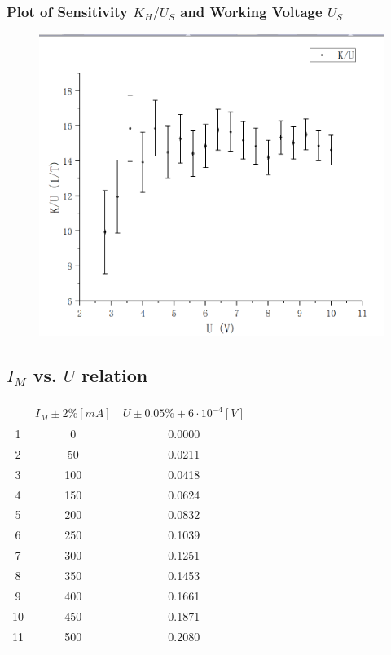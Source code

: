 \documentclass[12pt]{article}
\begin{document}
\subsubsection{Plot of Sensitivity $K_H/U_S$ and Working Voltage $U_S$}
\begin{figure}[H]
\centering
\includegraphics[scale=0.25]{P7.jpg}
\end{figure}
\subsection{$I_M$ vs. $U$ relation}
\begin{table}[H]
\centering
\begin{tabular}{|c|c|c|}
\hline
  &$I_M\pm2\%[mA]$&$U\pm0.05\%+6\cdot 10^{-4}[V]$  \\ \hline
1 &0    &0.0000  \\ \hline
2 &50   &0.0211  \\ \hline
3 &100  &0.0418  \\ \hline
4 &150  &0.0624  \\ \hline
5 &200  &0.0832  \\ \hline
6 &250  &0.1039  \\ \hline
7 &300  &0.1251  \\ \hline
8 &350  &0.1453  \\ \hline
9 &400  &0.1661  \\ \hline
10&450  &0.1871  \\ \hline
11&500  &0.2080  \\ \hline
\end{tabular}
\end{table}
\end{document}
